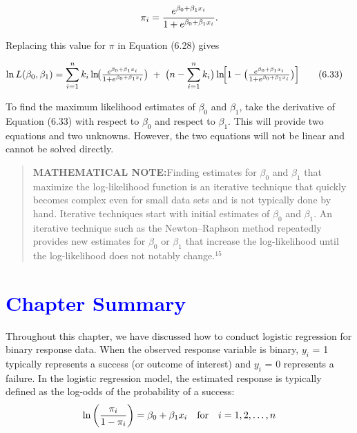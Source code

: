 \documentclass[
]{report}
\begin{document}
\begin{equation}
\pi_i = \frac{e^{\beta_0 + \beta_1 x_i}}{1 + e^{\beta_0 + \beta_1 x_i}}.
\notag
\end{equation}

Replacing this value for \(\scriptstyle \pi\) in Equation (6.28) gives

\begin{align}
\ln L(\beta_0, \beta_1)
&= \sum_{i=1}^n k_i \ln\!\bigl(\tfrac{e^{\beta_0 + \beta_1 x_i}}{1 + e^{\beta_0 + \beta_1 x_i}}\bigr)
\;+\;\bigl(n - \sum_{i=1}^n k_i\bigr)\ln\!\Bigl[1 - \bigl(\tfrac{e^{\beta_0 + \beta_1 x_i}}{1 + e^{\beta_0 + \beta_1 x_i}}\bigr)\Bigr]
\tag{6.33}
\end{align}

To find the maximum likelihood estimates of \(\scriptstyle \beta_0\) and \(\scriptstyle \beta_1\), take the derivative of Equation (6.33) with respect to \(\scriptstyle \beta_0\) and respect to \(\scriptstyle \beta_1\). This will provide two equations and two unknowns. However, the two equations will not be linear and cannot be solved directly.

\begin{quote}
\textbf{MATHEMATICAL NOTE:}Finding estimates for \(\scriptstyle \beta_0\) and \(\scriptstyle \beta_1\) that maximize the log-likelihood function is an iterative technique that quickly becomes complex even for small data sets and is not typically done by hand. Iterative techniques start with initial estimates of \(\scriptstyle \beta_0\) and \(\scriptstyle \beta_1\). An iterative technique such as the Newton--Raphson method repeatedly provides new estimates for \(\scriptstyle \beta_0\) or \(\scriptstyle \beta_1\) that increase the log-likelihood until the log-likelihood does not notably change.\(^{15}\)
\end{quote}

\hypertarget{section-76}{%
\section{\texorpdfstring{\textcolor{blue}{ Chapter Summary}}{}}\label{section-76}}

Throughout this chapter, we have discussed how to conduct logistic regression for binary response data. When the observed response variable is binary, \(\scriptstyle y_i\) = 1 typically represents a success (or outcome of interest) and \(\scriptstyle y_i\) = 0 represents a failure. In the logistic regression model, the estimated response is typically defined as the log-odds of the probability of a success:
\begin{align}
\ln\left(\frac{\pi_i}{1-\pi_i}\right) = \beta_0 + \beta_1 x_i \quad \text{for} \quad i = 1, 2, \ldots, n
\notag
\end{align}
\end{document}

